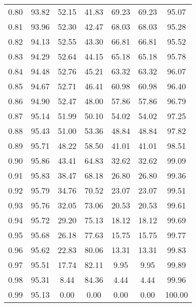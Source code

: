 \begin{tabular}{|c|c|c|c|c|c|c|}
      0.80 &     93.82 &     52.15 &      41.83 &   69.23 &      69.23 &         95.07 \\
      0.81 &     93.96 &     52.30 &      42.47 &   68.03 &      68.03 &         95.28 \\
      0.82 &     94.13 &     52.55 &      43.30 &   66.81 &      66.81 &         95.52 \\
      0.83 &     94.29 &     52.64 &      44.15 &   65.18 &      65.18 &         95.78 \\
      0.84 &     94.48 &     52.76 &      45.21 &   63.32 &      63.32 &         96.07 \\
      0.85 &     94.67 &     52.71 &      46.41 &   60.98 &      60.98 &         96.40 \\
      0.86 &     94.90 &     52.47 &      48.00 &   57.86 &      57.86 &         96.79 \\
      0.87 &     95.14 &     51.99 &      50.10 &   54.02 &      54.02 &         97.25 \\
      0.88 &     95.43 &     51.00 &      53.36 &   48.84 &      48.84 &         97.82 \\
      0.89 &     95.71 &     48.22 &      58.50 &   41.01 &      41.01 &         98.51 \\
      0.90 &     95.86 &     43.41 &      64.83 &   32.62 &      32.62 &         99.09 \\
      0.91 &     95.83 &     38.47 &      68.18 &   26.80 &      26.80 &         99.36 \\
      0.92 &     95.79 &     34.76 &      70.52 &   23.07 &      23.07 &         99.51 \\
      0.93 &     95.76 &     32.05 &      73.06 &   20.53 &      20.53 &         99.61 \\
      0.94 &     95.72 &     29.20 &      75.13 &   18.12 &      18.12 &         99.69 \\
      0.95 &     95.68 &     26.18 &      77.63 &   15.75 &      15.75 &         99.77 \\
      0.96 &     95.62 &     22.83 &      80.06 &   13.31 &      13.31 &         99.83 \\
      0.97 &     95.51 &     17.74 &      82.11 &    9.95 &       9.95 &         99.89 \\
      0.98 &     95.31 &      8.44 &      84.36 &    4.44 &       4.44 &         99.96 \\
      0.99 &     95.13 &      0.00 &       0.00 &    0.00 &       0.00 &        100.00 \\
\bottomrule
\end{tabular}
